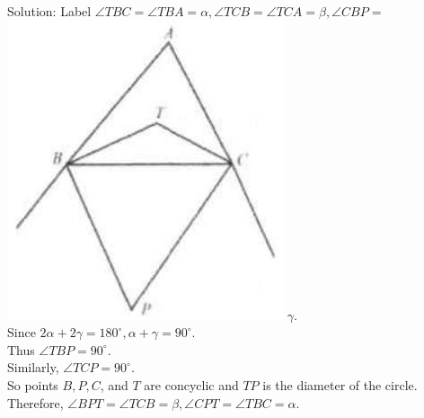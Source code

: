 \documentclass[10pt]{article}
\begin{document}
Solution:
Label \(\angle T B C=\angle T B A=\alpha, \angle T C B=\angle T C A=\beta, \angle C B P=\)\\
\includegraphics[max width=\textwidth]{2025_04_17_97bc1f7e44d93c271a88g-195} \(\gamma\).\\
Since \(2 \alpha+2 \gamma=180^{\circ}, \alpha+\gamma=90^{\circ}\).\\
Thus \(\angle T B P=90^{\circ}\).\\
Similarly, \(\angle T C P=90^{\circ}\).\\
So points \(B, P, C\), and \(T\) are concyclic and \(T P\) is the diameter of the circle.\\
Therefore, \(\angle B P T=\angle T C B=\beta, \angle C P T=\angle T B C=\alpha\).\\
\end{document}
